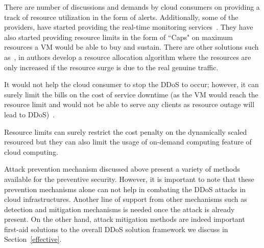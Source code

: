 \documentclass[final,5p,times,twocolumn]{elsarticle}
\begin{document}
There are number of discussions and demands by cloud consumers on providing a track of resource utilization in the form of alerts. Additionally, some of the providers, have started providing the real-time monitoring services~\cite{Cloudwatch}. They have also started providing resource limits in the form of ``Caps" on maximum resources a VM would be able to buy and sustain. {There are other solutions such as~\cite{DARAC}, in authors develop a resource allocation algorithm where the resources are only increased if the resource surge is due to the real genuine traffic. }

{It would not help the cloud consumer to stop the DDoS to occur; however, it can surely limit the bills on the cost of service downtime (as the VM would reach the resource limit and would not be able to serve any clients as resource outage will lead to DDoS)~\cite{amazondiscussionforum}.}

{Resource limits can surely restrict the cost penalty on the dynamically scaled resourced but they can also limit the usage of on-demand computing feature of cloud computing. }

{Attack prevention mechanism discussed above present a variety of methods available for the preventive security. However, it is important to note that these prevention mechanisms alone can not help in combating the DDoS attacks in cloud infrastructures. Another line of support from other mechanisms such as detection and mitigation mechanisms is needed once the attack is already present. On the other hand, attack mitigation methods are indeed important first-aid solutions to the overall DDoS solution framework we discuss in Section~\ref{effective}. }
\end{document}
